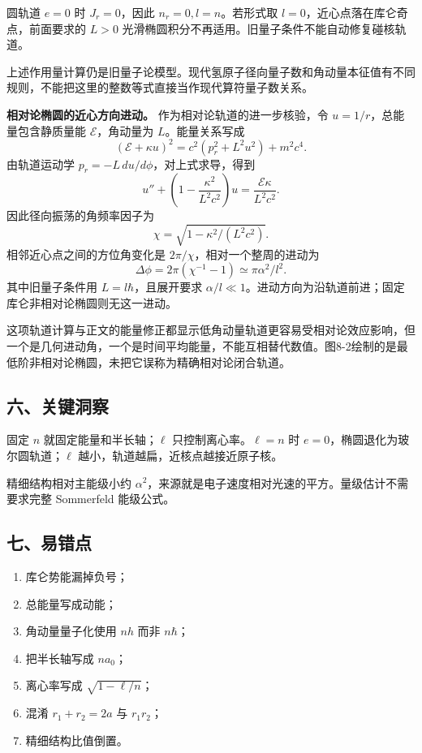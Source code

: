 \documentclass[12pt,a4paper,UTF8]{ctexart}
\newcommand{\tightlist}{\setlength{\itemsep}{0pt}\setlength{\parskip}{0pt}}
\begin{document}
圆轨道 \(e=0\) 时 \(J_r=0\)，因此 \(n_r=0,l=n\)。若形式取
\(l=0\)，近心点落在库仑奇点，前面要求的 \(L>0\)
光滑椭圆积分不再适用。旧量子条件不能自动修复碰核轨道。

上述作用量计算仍是旧量子论模型。现代氢原子径向量子数和角动量本征值有不同规则，不能把这里的整数等式直接当作现代算符量子数关系。

\textbf{相对论椭圆的近心方向进动。} 作为相对论轨道的进一步核验，令
\(u=1/r\)，总能量包含静质量能 \(\mathcal E\)，角动量为
\(L\)。能量关系写成 \[
(\mathcal E+\kappa u)^2=c^2(p_r^2+L^2u^2)+m^2c^4.
\] 由轨道运动学 \(p_r=-L\,du/d\phi\)，对上式求导，得到 \[
u''+\left(1-\frac{\kappa^2}{L^2c^2}\right)u
=\frac{\mathcal E\kappa}{L^2c^2}.
\] 因此径向振荡的角频率因子为 \[
\chi=\sqrt{1-\kappa^2/(L^2c^2)}.
\] 相邻近心点之间的方位角变化是 \(2\pi/\chi\)，相对一个整周的进动为 \[
\Delta\phi=2\pi(\chi^{-1}-1)
\simeq\pi\alpha^2/l^2.
\] 其中旧量子条件用 \(L=l\hbar\)，且展开要求
\(\alpha/l\ll1\)。进动方向为沿轨道前进；固定库仑非相对论椭圆则无这一进动。

这项轨道计算与正文的能量修正都显示低角动量轨道更容易受相对论效应影响，但一个是几何进动角，一个是时间平均能量，不能互相替代数值。图8-2绘制的是最低阶非相对论椭圆，未把它误称为精确相对论闭合轨道。

\subsection{六、关键洞察}\label{ux516dux5173ux952eux6d1eux5bdf-7}

固定 \(n\) 就固定能量和半长轴；\(\ell\) 只控制离心率。\(\ell=n\) 时
\(e=0\)，椭圆退化为玻尔圆轨道；\(\ell\)
越小，轨道越扁，近核点越接近原子核。

精细结构相对主能级小约
\(\alpha^2\)，来源就是电子速度相对光速的平方。量级估计不需要求完整
Sommerfeld 能级公式。

\subsection{七、易错点}\label{ux4e03ux6613ux9519ux70b9-7}

\begin{enumerate}
\def\labelenumi{\arabic{enumi}.}
\tightlist
\item
  库仑势能漏掉负号；
\item
  总能量写成动能；
\item
  角动量量子化使用 \(nh\) 而非 \(n\hbar\)；
\item
  把半长轴写成 \(na_0\)；
\item
  离心率写成 \(\sqrt{1-\ell/n}\)；
\item
  混淆 \(r_1+r_2=2a\) 与 \(r_1r_2\)；
\item
  精细结构比值倒置。
\end{enumerate}
\end{document}
